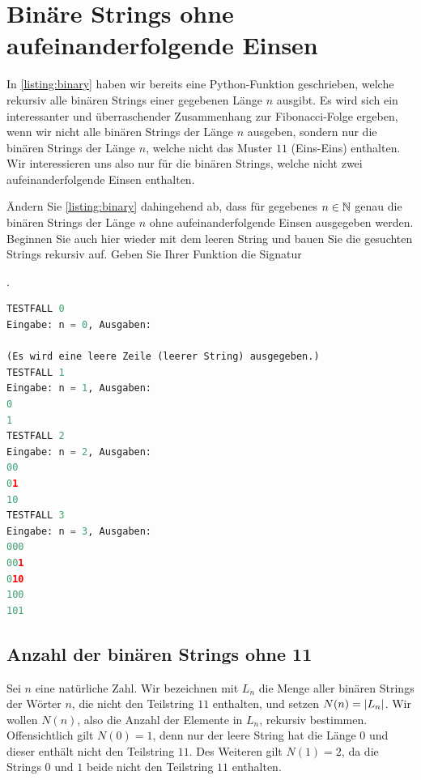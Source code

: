 \chapter{Binäre Strings ohne aufeinanderfolgende Einsen}\label{ch:Kapitel04}
In \cref{listing:binary} haben wir bereits eine Python-Funktion geschrieben, welche rekursiv alle binären Strings einer gegebenen Länge $n$ ausgibt. Es wird sich ein interessanter und überraschender Zusammenhang zur Fibonacci-Folge ergeben, wenn wir nicht alle binären Strings der Länge $n$ ausgeben, sondern nur die binären Strings der Länge $n$, welche nicht das Muster $11$ (Eins-Eins) enthalten. Wir interessieren uns also nur für die binären Strings, welche nicht zwei aufeinanderfolgende Einsen enthalten.
\begin{myexercise}\label{myexercise:0401}
	Ändern Sie \cref{listing:binary} dahingehend ab, dass für gegebenes $n\in\mathbb{N}$ genau die binären Strings der Länge $n$ ohne aufeinanderfolgende Einsen ausgegeben werden. Beginnen Sie auch hier wieder mit dem leeren String und bauen Sie die gesuchten Strings rekursiv auf. Geben Sie Ihrer Funktion die Signatur

	.
	\begin{lstlisting}[language=Python,caption=binäre Strings ohne 11 rekursiv ausgeben,numbers=none]
TESTFALL 0
Eingabe: n = 0, Ausgaben:

(Es wird eine leere Zeile (leerer String) ausgegeben.)
TESTFALL 1
Eingabe: n = 1, Ausgaben:
0
1
TESTFALL 2
Eingabe: n = 2, Ausgaben:
00
01
10
TESTFALL 3
Eingabe: n = 3, Ausgaben:
000
001
010
100
101
\end{lstlisting}
\end{myexercise}

\clearpage


\section{Anzahl der binären Strings ohne 11}
Sei $n$ eine natürliche Zahl. Wir bezeichnen mit $L_n$ die Menge aller binären Strings der Wörter $n$, die nicht den Teilstring $11$ enthalten, und setzen $N(n) = \left\lvert L_n\right\rvert$. Wir wollen $N(n)$, also die Anzahl der Elemente in $L_n$, rekursiv bestimmen. Offensichtlich gilt $N(0) = 1$, denn nur der leere String hat die Länge $0$ und dieser enthält nicht den Teilstring $11$. Des Weiteren gilt $N(1) = 2$, da die Strings $0$ und $1$ beide nicht den Teilstring $11$ enthalten.

